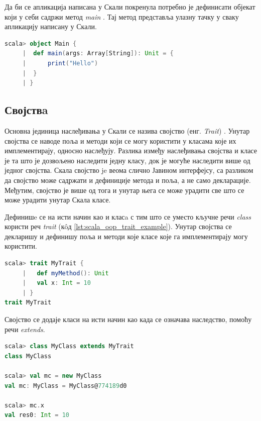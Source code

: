 \documentclass[12pt,oneside]{memoir}
\begin{document}
Да би се апликација написана у Скали покренула потребно је дефинисати објекат који у себи садржи метод \textit{main} \cite{scala_prog}. Тај метод представља улазну тачку у сваку апликацију написану у Скали.

\begin{lstlisting}[language=Scala, caption={Пример метода \textit{main}}, label={lst:scala_oop_main_method}, basicstyle=\small]
scala> object Main {
     |  def main(args: Array[String]): Unit = {
     |      print("Hello")
     | 	}
     | }
\end{lstlisting}

\subsection{Својствa}
\label{subsec:scala_traits}

Основна јединица наслеђивања у Скали се назива својство (енг. \textit{Trait}) \cite{scala_prog}. Унутар својства се наводе поља и методи који се могу користити у класама које их имплементирају, односно наслеђују. Разлика између наслеђивања својства и класе је та што је дозвољено наследити једну класу, док је могуће наследити више од једног својства. Скала својство je веома слично Јавином интерфејсу, са разликом да својство може садржати и дефиниције метода и поља, а не само декларације. Међутим, својство је више од тога и унутар њега се може урадити све што се може урадити унутар Скала класе.

Дефинишe се на исти начин као и класa с тим што се уместо кључне речи \textit{class} користи реч \textit{trait} (к\^{o}д \ref{lst:scala_oop_trait_example}). Унутар својства се декларишу и дефинишу поља и методи које класе које га имплементирају могу користити.

\begin{lstlisting}[language=Scala, caption={Скала својство}, label={lst:scala_oop_trait_example}, basicstyle=\small]
scala> trait MyTrait {
     |   def myMethod(): Unit
     |   val x: Int = 10
     | }
trait MyTrait
\end{lstlisting}

\noindent Својство се додаје класи на исти начин као када се означава наследство, помоћу речи \textit{extends}. 

\begin{lstlisting}[language=Scala, caption={Додавање својства класи}, label={lst:scala_oop_traits_extends_example}, basicstyle=\small]
scala> class MyClass extends MyTrait
class MyClass

scala> val mc = new MyClass
val mc: MyClass = MyClass@774189d0

scala> mc.x
val res0: Int = 10
\end{lstlisting}
\end{document}
